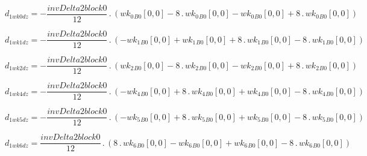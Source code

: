 \documentclass{article}
\begin{document}
\begin{dmath}d_{1 wk0 dz} = - \frac{invDelta2block0}{12} \,.\, \left({wk_{0}{_{B0}}}[{0,0}] - 8 \,.\, {wk_{0}{_{B0}}}[{0,0}] - {wk_{0}{_{B0}}}[{0,0}] + 8 \,.\, {wk_{0}{_{B0}}}[{0,0}]\right)\end{dmath}

\begin{dmath}d_{1 wk1 dz} = - \frac{invDelta2block0}{12} \,.\, \left(- {wk_{1}{_{B0}}}[{0,0}] + {wk_{1}{_{B0}}}[{0,0}] + 8 \,.\, {wk_{1}{_{B0}}}[{0,0}] - 8 \,.\, {wk_{1}{_{B0}}}[{0,0}]\right)\end{dmath}

\begin{dmath}d_{1 wk2 dz} = - \frac{invDelta2block0}{12} \,.\, \left({wk_{2}{_{B0}}}[{0,0}] - 8 \,.\, {wk_{2}{_{B0}}}[{0,0}] - {wk_{2}{_{B0}}}[{0,0}] + 8 \,.\, {wk_{2}{_{B0}}}[{0,0}]\right)\end{dmath}

\begin{dmath}d_{1 wk4 dz} = - \frac{invDelta2block0}{12} \,.\, \left(- {wk_{4}{_{B0}}}[{0,0}] + 8 \,.\, {wk_{4}{_{B0}}}[{0,0}] + {wk_{4}{_{B0}}}[{0,0}] - 8 \,.\, {wk_{4}{_{B0}}}[{0,0}]\right)\end{dmath}

\begin{dmath}d_{1 wk5 dz} = - \frac{invDelta2block0}{12} \,.\, \left(- {wk_{5}{_{B0}}}[{0,0}] + 8 \,.\, {wk_{5}{_{B0}}}[{0,0}] + {wk_{5}{_{B0}}}[{0,0}] - 8 \,.\, {wk_{5}{_{B0}}}[{0,0}]\right)\end{dmath}

\begin{dmath}d_{1 wk6 dz} = \frac{invDelta2block0}{12} \,.\, \left(8 \,.\, {wk_{6}{_{B0}}}[{0,0}] - {wk_{6}{_{B0}}}[{0,0}] + {wk_{6}{_{B0}}}[{0,0}] - 8 \,.\, {wk_{6}{_{B0}}}[{0,0}]\right)\end{dmath}
\end{document}
